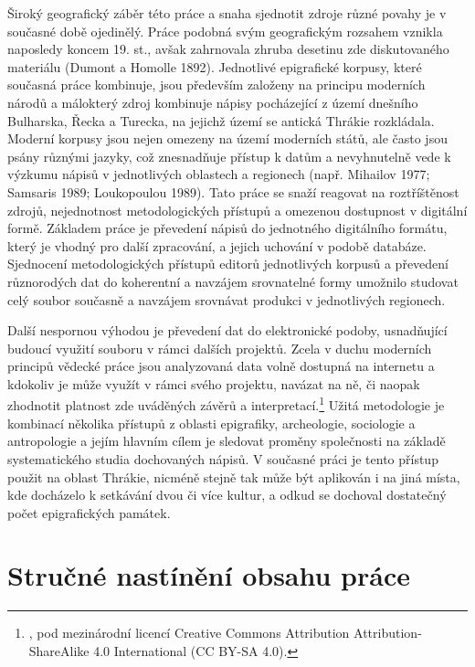 Široký geografický záběr této práce a snaha sjednotit zdroje různé povahy je v současné době ojedinělý. Práce podobná svým geografickým rozsahem vznikla naposledy koncem 19. st., avšak zahrnovala zhruba desetinu zde diskutovaného materiálu (Dumont a Homolle 1892). Jednotlivé epigrafické korpusy, které současná práce kombinuje, jsou především založeny na principu moderních národů a málokterý zdroj kombinuje nápisy pocházející z území dnešního Bulharska, Řecka a Turecka, na jejichž území se antická Thrákie rozkládala. Moderní korpusy jsou nejen omezeny na území moderních států, ale často jsou psány různými jazyky, což znesnadňuje přístup k datům a nevyhnutelně vede k výzkumu nápisů v jednotlivých oblastech a regionech (např. Mihailov 1977; Samsaris 1989; Loukopoulou 1989). Tato práce se snaží reagovat na roztříštěnost zdrojů, nejednotnost metodologických přístupů a omezenou dostupnost v digitální formě. Základem práce je převedení nápisů do jednotného digitálního formátu, který je vhodný pro další zpracování, a jejich uchování v podobě databáze. Sjednocení metodologických přístupů editorů jednotlivých korpusů a převedení různorodých dat do koherentní a navzájem srovnatelné formy umožnilo studovat celý soubor současně a navzájem srovnávat produkci v jednotlivých regionech.

Další nespornou výhodou je převedení dat do elektronické podoby, usnadňující budoucí využití souboru v rámci dalších projektů. Zcela v duchu moderních principů vědecké práce jsou analyzovaná data volně dostupná na internetu a kdokoliv je může využít v rámci svého projektu, navázat na ně, či naopak zhodnotit platnost zde uváděných závěrů a interpretací.\footnote{\from[url1], pod mezinárodní licencí Creative Commons Attribution Attribution-ShareAlike 4.0 International (CC BY-SA 4.0).} Užitá metodologie je kombinací několika přístupů z oblasti epigrafiky, archeologie, sociologie a antropologie a jejím hlavním cílem je sledovat proměny společnosti na základě systematického studia dochovaných nápisů. V současné práci je tento přístup použit na oblast Thrákie, nicméně stejně tak může být aplikován i na jiná místa, kde docházelo k setkávání dvou či více kultur, a odkud se dochoval dostatečný počet epigrafických památek.

\section[stručné-nastínění-obsahu-práce]{Stručné nastínění obsahu práce}

